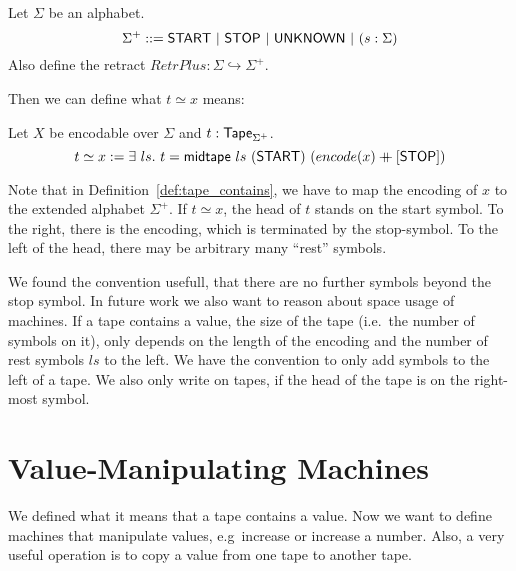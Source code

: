 \begin{definition}[$\Sigma^+$] Let $\Sigma$ be an alphabet.
  \[
    \Sigma^+ ::= \textsf{START} ~|~ \textsf{STOP} ~|~ \textsf{UNKNOWN} ~|~ (s: \Sigma)
  \]
  Also define the retract $RetrPlus : \Sigma \hookrightarrow \Sigma^+$.
\end{definition}

Then we can define what $t \simeq x$ means:

\begin{definition}[$t \simeq x$]
  \label{def:tape_contains}
  Let $X$ be encodable over $\Sigma$ and $t : \textsf{Tape}_{\Sigma^+}$.
  \[
    t \simeq x := \exists~ls.~
    t = \textsf{midtape}~ls~(\textsf{START})~(encode(x) \mathbin{+\mkern-10mu+} [\textsf{STOP}])
  \]
\end{definition}

Note that in Definition~\ref{def:tape_contains}, we have to map the encoding of $x$ to the extended alphabet $\Sigma^+$.  If $t \simeq x$, the head of
$t$ stands on the start symbol.  To the right, there is the encoding, which is terminated by the stop-symbol.  To the left of the head, there may be
arbitrary many ``rest'' symbols.

We found the convention usefull, that there are no further symbols beyond the stop symbol.  In future work we also want to reason about space usage of
machines.  If a tape contains a value, the size of the tape (i.e.\ the number of symbols on it), only depends on the length of the encoding and the
number of rest symbols $ls$ to the left.  We have the convention to only add symbols to the left of a tape.  We also only write on tapes, if the head
of the tape is on the right-most symbol.

\section{Value-Manipulating Machines}
\label{sec:value-manipulate}


We defined what it means that a tape contains a value.  Now we want to define machines that manipulate values, e.g\ increase or increase a number.
Also, a very useful operation is to copy a value from one tape to another tape.


\todo{}








